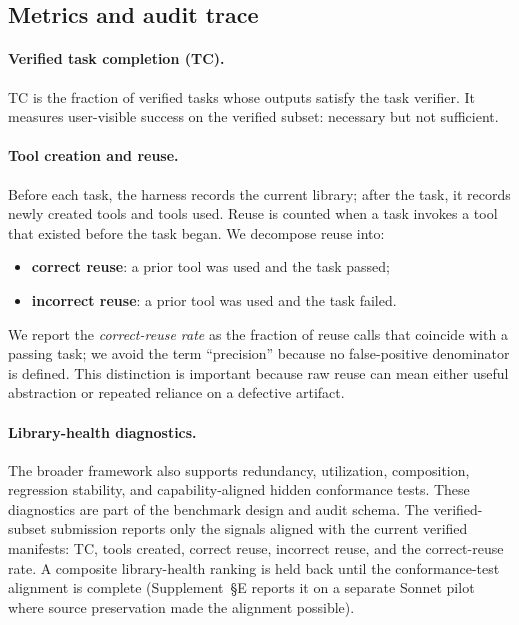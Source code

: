 \documentclass[sigconf,anonymous,review,natbib=false]{acmart}
\begin{document}
\subsection{Metrics and audit trace}

\paragraph{Verified task completion (TC).}
TC is the fraction of verified tasks whose outputs satisfy the task verifier. It measures user-visible success on the verified subset: necessary but not sufficient.

\paragraph{Tool creation and reuse.}
Before each task, the harness records the current library; after the task, it records newly created tools and tools used. Reuse is counted when a task invokes a tool that existed before the task began. We decompose reuse into:
\begin{itemize}[leftmargin=1.2em,noitemsep]
  \item \textbf{correct reuse}: a prior tool was used and the task passed;
  \item \textbf{incorrect reuse}: a prior tool was used and the task failed.
\end{itemize}
We report the \emph{correct-reuse rate} as the fraction of reuse calls that coincide with a passing task; we avoid the term ``precision'' because no false-positive denominator is defined. This distinction is important because raw reuse can mean either useful abstraction or repeated reliance on a defective artifact.

\paragraph{Library-health diagnostics.}
The broader framework also supports redundancy, utilization, composition, regression stability, and capability-aligned hidden conformance tests. These diagnostics are part of the benchmark design and audit schema. The verified-subset submission reports only the signals aligned with the current verified manifests: TC, tools created, correct reuse, incorrect reuse, and the correct-reuse rate. A composite library-health ranking is held back until the conformance-test alignment is complete (Supplement~\S E reports it on a separate Sonnet pilot where source preservation made the alignment possible).
\end{document}

